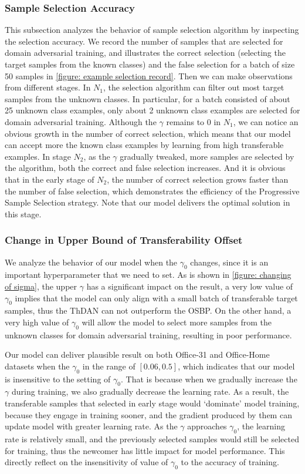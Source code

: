 \subsubsection{Sample Selection Accuracy}
This subsection analyzes the behavior of sample selection algorithm by inspecting the selection accuracy. 
We record the number of samples that are selected for domain adversarial training, and illustrates the correct selection (selecting the target samples from the known classes) and the false selection for a batch of size 50 samples in \figurename{\ref{figure: example selection record}}. 
Then we can make observations from different stages. 
In $N_1$, the selection algorithm can filter out most target samples from the unknown classes. In particular, for a batch consisted of about 25 unknown class examples, only about 2 unknown class examples are selected for domain adversarial training. Although the $\gamma$ remains to 0 in $N_1$, we can notice an obvious growth in the number of correct selection, which means that our model can accept more the known class examples by learning from high transferable examples. 
In stage $N_2$, as the $\gamma$ gradually tweaked, more samples are selected by the algorithm, both the correct and false selection increases. And it is obvious that in the early stage of $N_2$, the number of correct selection grows faster than the number of false selection, which demonstrates the efficiency of the Progressive Sample Selection strategy. Note that our model delivers the optimal solution in this stage. 

\subsubsection{Change in Upper Bound of Transferability Offset}
We analyze the behavior of our model when the $\gamma_0$ changes, since it is an important hyperparameter that we need to set. 
As is shown in \figurename{\ref{figure: changing of sigma}}, the upper $\gamma$ has a significant impact on the result, a very low value of $\gamma_0$ implies that the model can only align with a small batch of transferable target samples, thus the ThDAN can not outperform the OSBP. 
On the other hand, a very high value of $\gamma_0$ will allow the model to select more samples from the unknown classes for domain adversarial training, resulting in poor performance. 

Our model can deliver plausible result on both Office-31 and Office-Home datasets when the $\gamma_0$ in the range of $[0.06, 0.5]$, which indicates that our model is insensitive to the setting of $\gamma_0$. 
That is because when we gradually increase the $\gamma$ during training, we also gradually decrease the learning rate. 
As a result, the transferable samples that selected in early stage would ‘dominate’ model training, because they engage in training sooner, and the gradient produced by them can update model with greater learning rate. 
As the $\gamma$ approaches $\gamma_0$, the learning rate is relatively small, and the previously selected samples would still be selected for training, thus the newcomer has little impact for model performance. 
This directly reflect on the insensitivity of value of $\gamma_0$ to the accuracy of training. 


